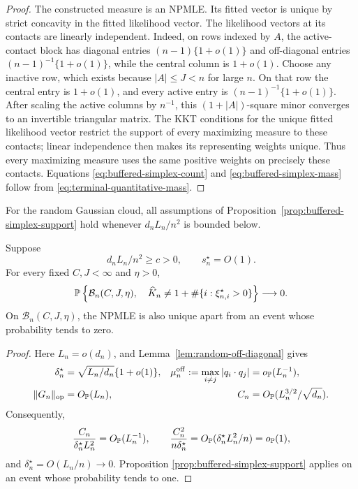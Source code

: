 \begin{proof}
The constructed measure is an NPMLE\@. Its fitted vector is unique by
strict concavity in the fitted likelihood vector.  The likelihood vectors
at its contacts are linearly independent.  Indeed, on rows indexed by
\(A\), the active-contact block has diagonal entries
\((n-1)\{1+o(1)\}\) and off-diagonal entries
\((n-1)^{-1}\{1+o(1)\}\), while the central column is \(1+o(1)\).
Choose any inactive row, which exists because \(|A|\le J<n\) for large
\(n\).  On that row the central entry is \(1+o(1)\), and every active
entry is \((n-1)^{-1}\{1+o(1)\}\).  After scaling the active columns by
\(n^{-1}\), this \((1+|A|)\)-square minor converges to an invertible
triangular matrix.  The KKT conditions for the unique fitted likelihood
vector restrict the support of every maximizing measure to these contacts;
linear independence then makes its representing weights unique.  Thus every
maximizing measure uses the same positive weights on precisely these
contacts.  Equations
\eqref{eq:buffered-simplex-count} and \eqref{eq:buffered-simplex-mass}
follow from \eqref{eq:terminal-quantitative-mass}.
\end{proof}

For the random Gaussian cloud, all assumptions of
Proposition~\ref{prop:buffered-simplex-support} hold whenever
\(d_nL_n/n^2\) is bounded below.

\begin{corollary}
\label{cor:random-buffered-simplex-support}
Suppose
\[
 d_nL_n/n^2\ge c>0,
 \qquad s_n^\star=O(1).
\]
For every fixed \(C,J<\infty\) and \(\eta>0\),
\begin{equation}
\label{eq:random-buffered-simplex-support}
 \mathbb P\left\{
  \mathcal B_n(C,J,\eta),\quad
  \widehat K_n\ne1+\#\{i:\xi_{n,i}^\star>0\}
 \right\}\longrightarrow0.
\end{equation}
On \(\mathcal B_n(C,J,\eta)\), the NPMLE is also unique apart from an event
whose probability tends to zero.
\end{corollary}

\begin{proof}
Here \(L_n=o(d_n)\), and Lemma~\ref{lem:random-off-diagonal} gives
\begin{align*}
 \delta_n^\star&=\sqrt{L_n/d_n}\{1+o(1)\},&
 \mu_n^{\rm off}:=\max_{i\ne j}|q_i\cdot q_j|
   &=o_{\mathbb P}(L_n^{-1}),\\
 \|G_n\|_{\rm op}&=O_{\mathbb P}(L_n),&
 C_n&=O_{\mathbb P}(L_n^{3/2}/\sqrt{d_n}).
\end{align*}
Consequently,
\[
 \frac{C_n}{\delta_n^\star L_n^2}=O_{\mathbb P}(L_n^{-1}),
 \qquad
 \frac{C_n^2}{n\delta_n^\star}
 =O_{\mathbb P}(\delta_n^\star L_n^2/n)=o_{\mathbb P}(1),
\]
and \(\delta_n^\star=O(L_n/n)\to0\).  Proposition
\ref{prop:buffered-simplex-support} applies on an event whose probability
tends to one.
\end{proof}
